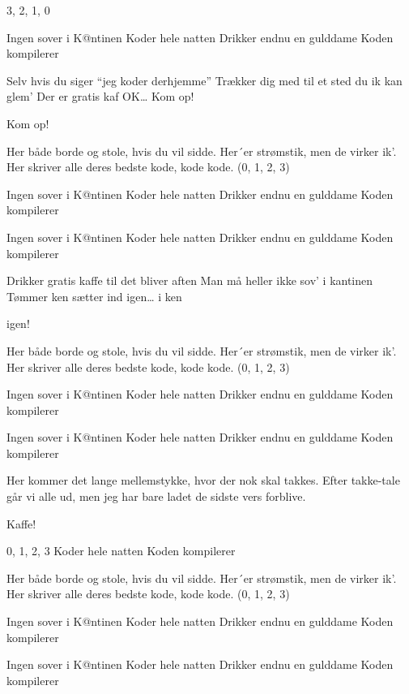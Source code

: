 \documentclass{article}
\begin{document}
\newpage%
\begin{song}
 3, 2, 1, 0

 Ingen sover i K@ntinen
Koder hele natten
Drikker endnu en gulddame
Koden kompilerer

 Selv hvis du siger “jeg koder derhjemme”
Trækker dig med til et sted du ik kan glem’
Der er gratis kaf OK… Kom op!

Kom op!

 Her både borde og stole, hvis du vil sidde.
Her´er strømstik, men de virker ik’.
Her skriver alle deres bedste kode, kode kode. (0, 1, 2, 3)

 Ingen sover i K@ntinen
Koder hele natten
Drikker endnu en gulddame
Koden kompilerer

 Ingen sover i K@ntinen
Koder hele natten
Drikker endnu en gulddame
Koden kompilerer

 Drikker gratis kaffe til det bliver aften
Man må heller ikke sov’ i kantinen
Tømmer ken sætter ind igen… i ken

igen!

 Her både borde og stole, hvis du vil sidde.
Her´er strømstik, men de virker ik’.
Her skriver alle deres bedste kode, kode kode. (0, 1, 2, 3)

 Ingen sover i K@ntinen
Koder hele natten
Drikker endnu en gulddame
Koden kompilerer

 Ingen sover i K@ntinen
Koder hele natten
Drikker endnu en gulddame
Koden kompilerer

\scene{} Her kommer det lange mellemstykke, hvor der nok skal takkes. Efter takke-tale går vi alle ud, men jeg har bare ladet de sidste vers forblive.


 Kaffe!

 0, 1, 2, 3
Koder hele natten
Koden kompilerer

 Her både borde og stole, hvis du vil sidde.
Her´er strømstik, men de virker ik’.
Her skriver alle deres bedste kode, kode kode. (0, 1, 2, 3)

 Ingen sover i K@ntinen
Koder hele natten
Drikker endnu en gulddame
Koden kompilerer

 Ingen sover i K@ntinen
Koder hele natten
Drikker endnu en gulddame
Koden kompilerer
\end{song}
\end{document}
